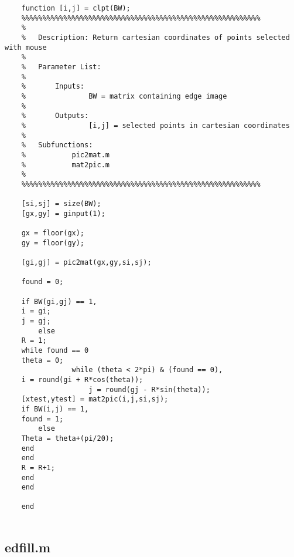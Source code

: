 \begin{lstlisting}
	function [i,j] = clpt(BW);
	%%%%%%%%%%%%%%%%%%%%%%%%%%%%%%%%%%%%%%%%%%%%%%%%%%%%%%%%%
	%
	%	Description: Return cartesian coordinates of points selected with mouse
	%
	%	Parameter List:
	%
	%		Inputs:
	%				BW = matrix containing edge image
	%
	%		Outputs:
	%				[i,j] = selected points in cartesian coordinates
	%
	%	Subfunctions:
	%			pic2mat.m
	%			mat2pic.m
	%
	%%%%%%%%%%%%%%%%%%%%%%%%%%%%%%%%%%%%%%%%%%%%%%%%%%%%%%%%%
	
	[si,sj] = size(BW);
	[gx,gy] = ginput(1);
	
	gx = floor(gx);
	gy = floor(gy);
	
	[gi,gj] = pic2mat(gx,gy,si,sj);
	
	found = 0;
	
	if BW(gi,gj) == 1,
	i = gi;
	j = gj;
		else
	R = 1;
	while found == 0
	theta = 0;
				while (theta < 2*pi) & (found == 0),
	i = round(gi + R*cos(theta));
					j = round(gj - R*sin(theta));
	[xtest,ytest] = mat2pic(i,j,si,sj);
	if BW(i,j) == 1,
	found = 1;
		else
	Theta = theta+(pi/20);
	end
	end
	R = R+1;
	end
	end
	
	end
	
\end{lstlisting}

\newpage 

\subsection{edfill.m}

